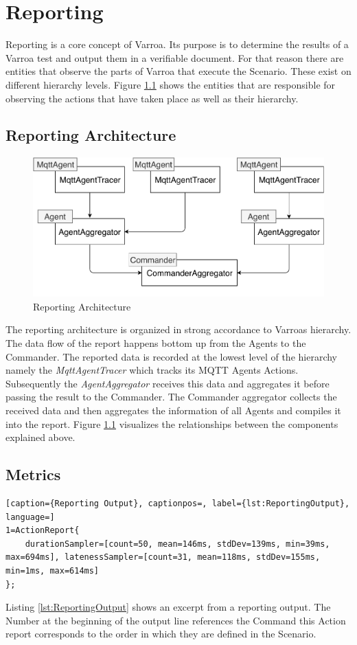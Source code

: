 \chapter{Reporting}\label{sec:Reporting}
Reporting is a core concept of Varroa.
Its purpose is to determine the results of a Varroa test and output them in a verifiable document.
For that reason there are entities that observe the parts of Varroa that execute the Scenario.
These exist on different hierarchy levels.
Figure \ref{fig:ReportingArchitecture} shows the entities that are responsible for observing the actions that have taken place as well as their hierarchy.

\section{Reporting Architecture}
\begin{figure}[H]
	\begin{center}
		\includegraphics[scale=0.75]{Resources/PDF/ReportingArchitecture}
		\caption{Reporting Architecture}
		\label{fig:ReportingArchitecture}
	\end{center}
\end{figure}
The reporting architecture is organized in strong accordance to Varroas hierarchy.
The data flow of the report happens bottom up from the Agents to the Commander.
The reported data is recorded at the lowest level of the hierarchy namely the \emph{MqttAgentTracer} which tracks its MQTT Agents Actions.
Subsequently the \emph{AgentAggregator} receives this data and aggregates it before passing the result to the Commander.
The Commander aggregator collects the received data and then aggregates the information of all Agents and compiles it into the report.
Figure \ref{fig:ReportingArchitecture} visualizes the relationships between the components explained above.

\section{Metrics}
\begin{lstlisting}[caption={Reporting Output}, captionpos=, label={lst:ReportingOutput}, language=]
1=ActionReport{
	durationSampler=[count=50, mean=146ms, stdDev=139ms, min=39ms, max=694ms], latenessSampler=[count=31, mean=118ms, stdDev=155ms, min=1ms, max=614ms]
};
\end{lstlisting}
Listing \ref{lst:ReportingOutput} shows an excerpt from a reporting output.
The Number at the beginning of the output line references the Command this Action report corresponds to the order in which they are defined in the Scenario.

